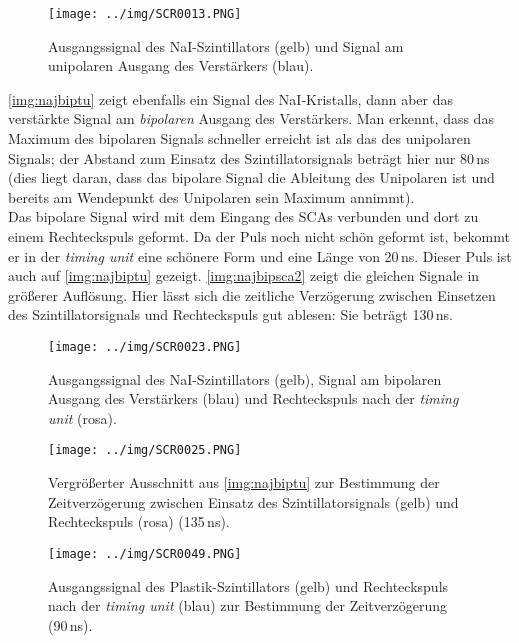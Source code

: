 \begin{figure}[H]
\begin{center}
  \texttt{[image: ../img/SCR0013.PNG]}
  \caption[---]{Ausgangssignal des NaI-Szintillators (gelb) und Signal am unipolaren Ausgang des Verstärkers (blau).}
  \label{img:najunip}
\end{center}
\end{figure}

\autoref{img:najbiptu} zeigt ebenfalls ein Signal des NaI-Kristalls,
dann aber das verstärkte Signal am \emph{bipolaren} Ausgang des Verstärkers.
Man erkennt, dass das Maximum des bipolaren Signals schneller erreicht ist als das des unipolaren Signals;
der Abstand zum Einsatz des Szintillatorsignals beträgt hier nur 80\,ns (dies liegt daran,
dass das bipolare Signal die Ableitung des Unipolaren ist und bereits am Wendepunkt des Unipolaren sein Maximum
annimmt).\\
Das bipolare Signal wird mit dem Eingang des SCAs verbunden und dort zu einem Rechteckspuls geformt.
Da der Puls noch nicht schön geformt ist, bekommt er in der \emph{timing unit} eine schönere Form und eine Länge von
20\,ns. Dieser Puls ist auch auf \autoref{img:najbiptu} gezeigt.
\autoref{img:najbipsca2} zeigt die gleichen Signale in größerer Auflösung.
Hier lässt sich die zeitliche Verzögerung zwischen Einsetzen des Szintillatorsignals und Rechteckspuls
gut ablesen: Sie beträgt 130\,ns.

\begin{figure}[H]
\begin{center}
  \texttt{[image: ../img/SCR0023.PNG]}
  \caption[---]{Ausgangssignal des NaI-Szintillators (gelb),
  Signal am bipolaren Ausgang des Verstärkers (blau)
  und Rechteckspuls nach der \emph{timing unit} (rosa).}
  \label{img:najbiptu}
\end{center}
\end{figure}

\begin{figure}[H]
\begin{center}
  \texttt{[image: ../img/SCR0025.PNG]}
  \caption[---]{Vergrößerter Ausschnitt aus \autoref{img:najbiptu} zur Bestimmung der Zeitverzögerung zwischen
  Einsatz des Szintillatorsignals (gelb) und Rechteckspuls (rosa) (135\,ns).}
  \label{img:najbipsca2}
\end{center}
\end{figure}

\begin{figure}[H]
\begin{center}
  \texttt{[image: ../img/SCR0049.PNG]}
  \caption[---]{Ausgangssignal des Plastik-Szintillators (gelb) und
  Rechteckspuls nach der \emph{timing unit} (blau) zur Bestimmung der Zeitverzögerung (90\,ns).}
  \label{img:plastiktu}
\end{center}
\end{figure}


